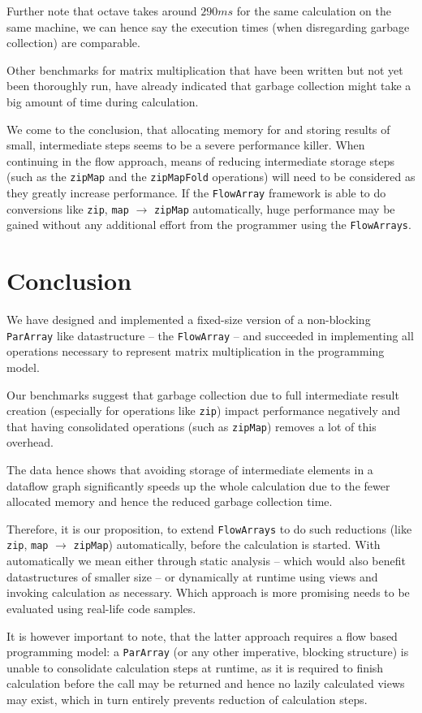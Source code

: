 \documentclass[runningheads,a4paper,fleqn]{llncs}
\begin{document}
Further note that octave \cite{eaton1997gnu} takes around $290 ms$ for
the same calculation on the same machine, we can hence say the
execution times (when disregarding garbage collection) are
comparable.

Other benchmarks for matrix multiplication that have been written but
not 
yet been thoroughly run, have already indicated that garbage
collection might take a big amount of time during calculation.

We come to the conclusion, that allocating memory for and
storing results of small, intermediate steps seems to be a severe
performance 
killer. When continuing in the flow approach, means of reducing
intermediate storage steps (such as the
\texttt{zipMap} and the \texttt{zipMapFold} operations) will need to
be considered as they greatly increase performance. If the \texttt{FlowArray}
framework is able to do conversions like \texttt{zip}, \texttt{map}
$\to$ \texttt{zipMap} automatically, huge performance may be gained
without any additional effort from the programmer using the \texttt{FlowArrays}.

\section{Conclusion}
\label{sec:conclusion}

We have designed and implemented a fixed-size version of a non-blocking
\texttt{ParArray} like datastructure -- the \texttt{FlowArray} -- and succeeded in
implementing all operations necessary to represent matrix
multiplication in the programming model.

Our benchmarks suggest that garbage collection due to full
intermediate result creation (especially for operations like
\texttt{zip}) impact performance negatively and that having
consolidated operations (such as \texttt{zipMap}) removes a lot of
this overhead.

The data hence shows that avoiding storage of intermediate elements in
a dataflow graph significantly speeds up the whole calculation due to the fewer
allocated memory and hence the reduced garbage collection time.

Therefore, it is our proposition, to extend \texttt{FlowArrays} to do such
reductions (like \texttt{zip}, \texttt{map} $\to$ \texttt{zipMap})
automatically, before the calculation is started. With automatically
we mean either through static analysis -- which would also benefit
datastructures of smaller size -- or dynamically at runtime using
views and invoking calculation as necessary. Which approach is more
promising needs to be evaluated using real-life code samples.

It is however important to note, that the latter approach requires a
flow based programming model: a \texttt{ParArray} (or any other imperative,
blocking structure) is unable to consolidate calculation steps at
runtime, as it is required to finish calculation before the call may
be returned and hence no lazily calculated views may exist, which in
turn entirely prevents reduction of calculation steps.



\end{document}
